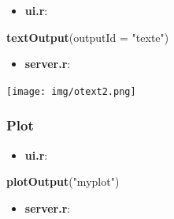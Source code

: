 \documentclass[
]{article}
\newenvironment{Shaded}{\begin{snugshade}}{\end{snugshade}}
\newcommand{\AttributeTok}[1]{\textcolor[rgb]{0.13,0.29,0.53}{#1}}
\newcommand{\FunctionTok}[1]{\textcolor[rgb]{0.13,0.29,0.53}{\textbf{#1}}}
\newcommand{\NormalTok}[1]{#1}
\newcommand{\OtherTok}[1]{\textcolor[rgb]{0.56,0.35,0.01}{#1}}
\newcommand{\SpecialCharTok}[1]{\textcolor[rgb]{0.81,0.36,0.00}{\textbf{#1}}}
\newcommand{\StringTok}[1]{\textcolor[rgb]{0.31,0.60,0.02}{#1}}
\providecommand{\tightlist}{%
  \setlength{\itemsep}{0pt}\setlength{\parskip}{0pt}}
\begin{document}
\begin{itemize}
\tightlist
\item
  \textbf{ui.r}:
\end{itemize}

\begin{Shaded}
\begin{Highlighting}[]
\FunctionTok{textOutput}\NormalTok{(}\AttributeTok{outputId =} \StringTok{"texte"}\NormalTok{)}
\end{Highlighting}
\end{Shaded}

\begin{itemize}
\tightlist
\item
  \textbf{server.r}:
\end{itemize}

\begin{Shaded}
\end{Shaded}

\texttt{[image: img/otext2.png]}

\hypertarget{plot}{%
\subsubsection{Plot}\label{plot}}

\begin{itemize}
\tightlist
\item
  \textbf{ui.r}:
\end{itemize}

\begin{Shaded}
\begin{Highlighting}[]
\FunctionTok{plotOutput}\NormalTok{(}\StringTok{"myplot"}\NormalTok{)}
\end{Highlighting}
\end{Shaded}

\begin{itemize}
\tightlist
\item
  \textbf{server.r}:
\end{itemize}

\begin{Shaded}
\end{Shaded}
\end{document}
